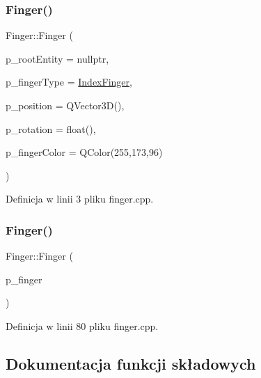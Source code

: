 \subsubsection{\texorpdfstring{Finger()}{Finger()}\hspace{0.1cm}{\footnotesize\ttfamily [1/2]}}
{\footnotesize\ttfamily Finger\+::\+Finger (\begin{DoxyParamCaption}\item[{Qt3\+D\+Core\+::\+Q\+Entity $\ast$}]{p\+\_\+root\+Entity = {\ttfamily nullptr},  }\item[{\hyperlink{class_finger_a365e6bba2e4877decf3c7641d29838c3}{Finger\+Type\+\_\+t}}]{p\+\_\+finger\+Type = {\ttfamily \hyperlink{class_finger_a365e6bba2e4877decf3c7641d29838c3a12cc2d85dc9a1a57ae93f22c1a8b94b4}{Index\+Finger}},  }\item[{Q\+Vector3D}]{p\+\_\+position = {\ttfamily QVector3D()},  }\item[{float}]{p\+\_\+rotation = {\ttfamily float()},  }\item[{Q\+Color}]{p\+\_\+finger\+Color = {\ttfamily QColor(255,173,96)} }\end{DoxyParamCaption})}



Definicja w linii 3 pliku finger.\+cpp.

\mbox{\label{class_finger_af4d20d484850d7bc84c959f45578a27d}} 
\subsubsection{\texorpdfstring{Finger()}{Finger()}\hspace{0.1cm}{\footnotesize\ttfamily [2/2]}}
{\footnotesize\ttfamily Finger\+::\+Finger (\begin{DoxyParamCaption}\item[{const \hyperlink{class_finger}{Finger} \&}]{p\+\_\+finger }\end{DoxyParamCaption})}



Definicja w linii 80 pliku finger.\+cpp.



\subsection{Dokumentacja funkcji składowych}
\mbox{\label{class_finger_a8b6275fb16f2066fae6a94702a5a7b92}} 
